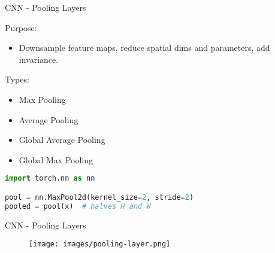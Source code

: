 \begin{frame}[fragile]{CNN - Pooling Layers}
\begin{block}{Purpose:}
    \begin{itemize}
        \item Downsample feature maps, reduce spatial dims and parameters, add invariance.
    \end{itemize}
\end{block}

\begin{block}{Types:}
    \begin{itemize}
        \item Max Pooling
        \item Average Pooling
        \item Global Average Pooling
        \item Global Max Pooling
    \end{itemize}
\end{block}

\begin{lstlisting}[language=Python, caption={Code snippet (PyTorch)}]
import torch.nn as nn

pool = nn.MaxPool2d(kernel_size=2, stride=2)
pooled = pool(x)  # halves H and W
\end{lstlisting}
\end{frame}  

\begin{frame}{CNN - Pooling Layers}
    \begin{figure}
    \centering
    \texttt{[image: images/pooling-layer.png]}
    \end{figure}
\end{frame}